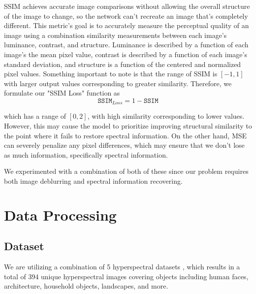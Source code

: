 \documentclass{article}
\begin{document}
SSIM achieves accurate image comparisons without allowing the overall structure of the image to change, so the network can't recreate an image that's completely different. This metric's goal is to accurately measure the perceptual quality of an image using a combination similarity
measurements between each image's luminance, contrast, and structure. Luminance is described by a function of each image's the mean pixel value, contrast is described by a function of each image's standard deviation, and structure is a function of the centered and normalized pixel values. Something important to note is that the range of SSIM is $[-1, 1]$ with larger output values corresponding to greater similarity. Therefore, we formulate our "SSIM Loss" function as
\begin{equation}
    \texttt{SSIM}_{Loss} = 1 - \texttt{SSIM}
\end{equation}

which has a range of $[0, 2]$, with high similarity corresponding to lower values. However, this may cause the model to prioritize improving structural similarity to the point where it fails to restore spectral information. On the other hand, MSE can severely penalize any pixel differences, which may ensure that we don't lose as much information, specifically spectral information. 

We experimented with a combination of both of these since our problem requires both image deblurring and spectral information recovering.

\section{Data Processing}
\subsection{Dataset}
We are utilizing a combination of 5 hyperspectral datasets \cite{CAVE_0293}\cite{chakrabarti2011statistics}\cite{arad_and_ben_shahar_2016_ECCV}\cite{DeepCASSI:SIGA:2017}\cite{farrell2003simulation}, which results in a total of 394 unique hyperspectral images covering objects including human faces, architecture, household objects, landscapes, and more.
\end{document}
